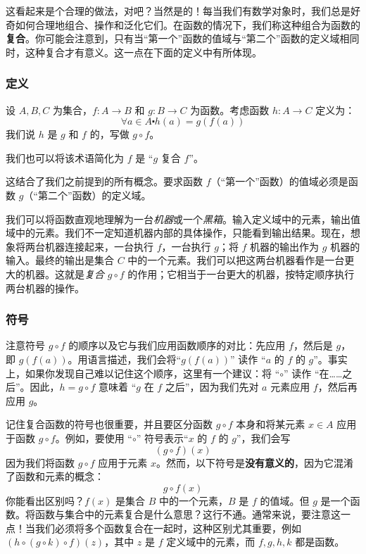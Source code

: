 这看起来是个合理的做法，对吧？当然是的！每当我们有数学对象时，我们总是好奇如何合理地组合、操作和泛化它们。在函数的情况下，我们称这种组合为函数的\textbf{复合}。你可能会注意到，只有当``第一个''函数的值域与``第二个''函数的定义域相同时，这种复合才有意义。这一点在下面的定义中有所体现。

\subsubsection*{定义}

\begin{definition}
    设 $A, B, C$ 为集合，$f : A \to B$ 和 $g : B \to C$ 为函数。考虑函数 $h : A \to C$ 定义为：
    \[\forall a \in A \centerdot h(a) = g(f(a))\]
    我们说 $h$ 是 $g$ 和 $f$ 的，写做 $g \circ f$。

    我们也可以将该术语简化为 $f$ 是 ``$g$ 复合 $f$''。
\end{definition}

这结合了我们之前提到的所有概念。要求函数 $f$（``第一个''函数）的值域必须是函数 $g$（``第二个''函数）的定义域。

我们可以将函数直观地理解为一台\emph{机器}或一个\emph{黑箱}。输入定义域中的元素，输出值域中的元素。我们不一定知道机器内部的具体操作，只能看到输出结果。现在，想象将两台机器连接起来，一台执行 $f$，一台执行 $g$；将 $f$ 机器的输出作为 $g$ 机器的输入。最终的输出是集合 $C$ 中的一个元素。我们可以把这两台机器看作是一台更大的机器。这就是\emph{复合} $g \circ f$ 的作用；它相当于一台更大的机器，按特定顺序执行两台机器的操作。

\subsubsection*{符号}

注意符号 $g \circ f$ 的顺序以及它与我们应用函数顺序的对比：先应用 $f$，然后是 $g$，即 $g(f(a))$。用语言描述，我们会将``$g(f(a))$'' 读作 ``$a$ 的 $f$ 的 $g$''。事实上，如果你发现自己难以记住这个顺序，这里有一个建议：将 “$\circ$” 读作 ``在……之后''。因此，$h = g \circ f$ 意味着 ``$g$ 在 $f$ 之后''，因为我们先对 $a$ 元素应用 $f$，然后再应用 $g$。

记住复合函数的符号也很重要，并且要区分函数 $g \circ f$ 本身和将某元素 $x \in A$ 应用于函数 $g \circ f$。例如，要使用 ``$\circ$'' 符号表示``$x$ 的 $f$ 的 $g$''，我们会写
\[(g \circ f)(x)\]
因为我们将函数 $g \circ f$ 应用于元素 $x$。然而，以下符号是\textbf{没有意义的}，因为它混淆了函数和元素的概念：
\[g \circ f(x)\]
你能看出区别吗？$f(x)$ 是集合 $B$ 中的一个元素，$B$ 是 $f$ 的值域。但 $g$ 是一个函数。将函数与集合中的元素复合是什么意思？这行不通。通常来说，要注意这一点！当我们必须将多个函数复合在一起时，这种区别尤其重要，例如 $(h \circ (g \circ k) \circ f)(z)$，其中 $z$ 是 $f$ 定义域中的元素，而 $f,g,h,k$ 都是函数。

